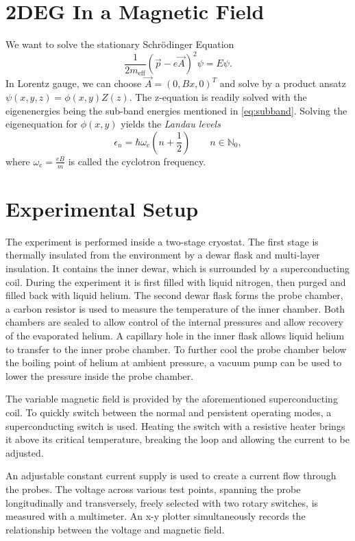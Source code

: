 \section{2DEG In a Magnetic Field}
We want to solve the stationary Schrödinger Equation
\begin{equation*}
	\frac{1}{2m_\text{eff}}\left(\vec{p}-e\vec{A}\right)^2\psi = E\psi.
\end{equation*}
In Lorentz gauge, we can choose $\vec{A}=(0, Bx, 0)^T$ and solve by a product ansatz $\psi(x,y,z) = \phi(x,y)Z(z)$.
The z-equation is readily solved with the eigenenergies being the sub-band energies mentioned in \autoref{eq:subband}.
Solving the eigenequation for $\phi(x,y)$ yields the \textit{Landau levels}
\begin{equation*}
	\epsilon_n = \hbar\omega_\text{c}\left(n+\frac{1}{2}\right)\qquad{n\in\mathbb{N}_0},
\end{equation*}
where $\omega_\text{c} = \frac{eB}{m}$ is called the cyclotron frequency.

\section{Experimental Setup}
The experiment is performed inside a two-stage cryostat.
The first stage is thermally insulated from the environment by a dewar flask and multi-layer insulation.
It contains the inner dewar, which is surrounded by a superconducting coil.
During the experiment it is first filled with liquid nitrogen, then purged and filled back with liquid helium.
The second dewar flask forms the probe chamber, a carbon resistor is used to measure the temperature of the inner chamber.
Both chambers are sealed to allow control of the internal pressures and allow recovery of the evaporated helium.
A capillary hole in the inner flask allows liquid helium to transfer to the inner probe chamber.
To further cool the probe chamber below the boiling point of helium at ambient pressure, a vacuum pump can be used to lower the pressure inside the probe chamber.

The variable magnetic field is provided by the aforementioned superconducting coil.
To quickly switch between the normal and persistent operating modes, a superconducting switch is used.
Heating the switch with a resistive heater brings it above its critical temperature, breaking the loop and allowing the current to be adjusted.

An adjustable constant current supply is used to create a current flow through the probes.
The voltage across various test points, spanning the probe longitudinally and transversely, freely selected with two rotary switches, is measured with a multimeter.
An x-y plotter simultaneously records the relationship between the voltage and magnetic field.
